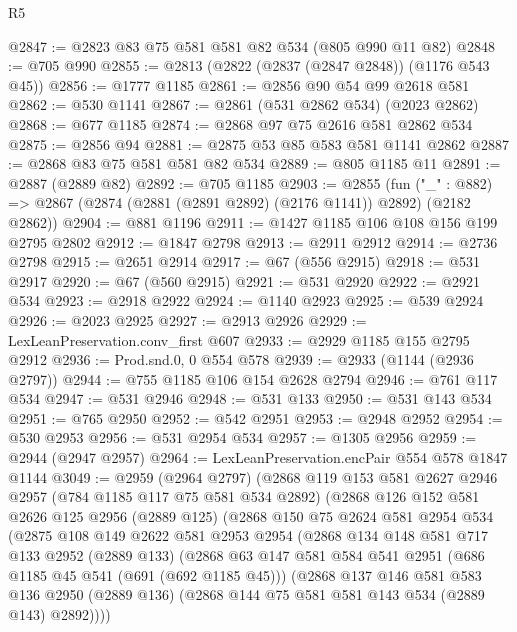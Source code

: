 \begin{lexlean}{R5}
\begin{coremodule}
@2847 := @2823 @83 @75 @581 @581 @82 @534 (@805 @990 @11 @82)
@2848 := @705 @990
@2855 := @2813 (@2822 (@2837 (@2847 @2848)) (@1176 @543 @45))
@2856 := @1777 @1185
@2861 := @2856 @90 @54 @99 @2618 @581
@2862 := @530 @1141
@2867 := @2861 (@531 @2862 @534) (@2023 @2862)
@2868 := @677 @1185
@2874 := @2868 @97 @75 @2616 @581 @2862 @534
@2875 := @2856 @94
@2881 := @2875 @53 @85 @583 @581 @1141 @2862
@2887 := @2868 @83 @75 @581 @581 @82 @534
@2889 := @805 @1185 @11
@2891 := @2887 (@2889 @82)
@2892 := @705 @1185
@2903 := @2855
    (fun ("_" : @882) => @2867 (@2874 (@2881 (@2891 @2892) (@2176 @1141)) @2892) (@2182 @2862))
@2904 := @881 @1196
@2911 := @1427 @1185 @106 @108 @156 @199 @2795 @2802
@2912 := @1847 @2798
@2913 := @2911 @2912
@2914 := @2736 @2798
@2915 := @2651 @2914
@2917 := @67 (@556 @2915)
@2918 := @531 @2917
@2920 := @67 (@560 @2915)
@2921 := @531 @2920
@2922 := @2921 @534
@2923 := @2918 @2922
@2924 := @1140 @2923
@2925 := @539 @2924
@2926 := @2023 @2925
@2927 := @2913 @2926
@2929 := LexLeanPreservation.conv_first @607
@2933 := @2929 @1185 @155 @2795 @2912
@2936 := Prod.snd.{0, 0} @554 @578
@2939 := @2933 (@1144 (@2936 @2797))
@2944 := @755 @1185 @106 @154 @2628 @2794
@2946 := @761 @117 @534
@2947 := @531 @2946
@2948 := @531 @133
@2950 := @531 @143 @534
@2951 := @765 @2950
@2952 := @542 @2951
@2953 := @2948 @2952
@2954 := @530 @2953
@2956 := @531 @2954 @534
@2957 := @1305 @2956
@2959 := @2944 (@2947 @2957)
@2964 := LexLeanPreservation.encPair @554 @578 @1847 @1144
@3049 := @2959
    (@2964 @2797)
    (@2868
      @119
      @153
      @581
      @2627
      @2946
      @2957
      (@784 @1185 @117 @75 @581 @534 @2892)
      (@2868
        @126
        @152
        @581
        @2626
        @125
        @2956
        (@2889 @125)
        (@2868
          @150
          @75
          @2624
          @581
          @2954
          @534
          (@2875
            @108
            @149
            @2622
            @581
            @2953
            @2954
            (@2868
              @134
              @148
              @581
              @717
              @133
              @2952
              (@2889 @133)
              (@2868
                @63
                @147
                @581
                @584
                @541
                @2951
                (@686 @1185 @45 @541 (@691 (@692 @1185 @45)))
                (@2868
                  @137
                  @146
                  @581
                  @583
                  @136
                  @2950
                  (@2889 @136)
                  (@2868 @144 @75 @581 @581 @143 @534 (@2889 @143) @2892))))

\end{coremodule}
\end{lexlean}
